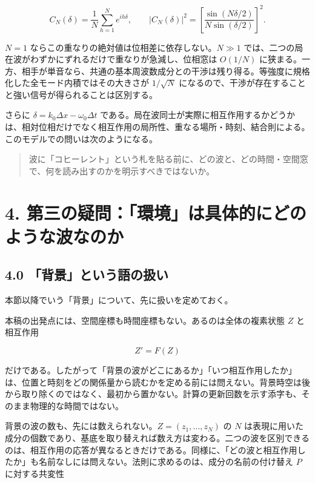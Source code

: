 \documentclass[
  a4paper,
]{ltjsarticle}
\begin{document}
\[
C_N(\delta)=\frac1N\sum_{h=1}^N e^{ih\delta},
\qquad
|C_N(\delta)|^2=
\left[\frac{\sin(N\delta/2)}{N\sin(\delta/2)}\right]^2.
\]

\(N=1\) ならこの重なりの絶対値は位相差に依存しない。\(N\gg1\)
では、二つの局在波がわずかにずれるだけで重なりが急減し、位相窓は
\(O(1/N)\)
に狭まる。一方、相手が単音なら、共通の基本周波数成分との干渉は残り得る。等強度に規格化した全モード内積ではその大きさが
\(1/\sqrt N\)
になるので、干渉が存在することと強い信号が得られることは区別する。

さらに \(\delta=k_0\Delta x-\omega_0\Delta t\)
である。局在波同士が実際に相互作用するかどうかは、相対位相だけでなく相互作用の局所性、重なる場所・時刻、結合則による。このモデルでの問いは次のようになる。

\begin{quote}
波に「コヒーレント」という札を貼る前に、どの波と、どの時間・空間窓で、何を読み出すのかを明示すべきではないか。
\end{quote}

\section{4.
第三の疑問：「環境」は具体的にどのような波なのか}\label{ux7b2cux4e09ux306eux7591ux554fux74b0ux5883ux306fux5177ux4f53ux7684ux306bux3069ux306eux3088ux3046ux306aux6ce2ux306aux306eux304b}

\subsection{4.0
「背景」という語の扱い}\label{ux80ccux666fux3068ux3044ux3046ux8a9eux306eux6271ux3044}

本節以降でいう「背景」について、先に扱いを定めておく。

本稿の出発点には、空間座標も時間座標もない。あるのは全体の複素状態 \(Z\)
と相互作用

\[
Z'=F(Z)
\]

だけである。したがって「背景の波がどこにあるか」「いつ相互作用したか」は、位置と時刻をどの関係量から読むかを定める前には問えない。背景時空は後から取り除くのではなく、最初から置かない。計算の更新回数を示す添字も、そのまま物理的な時間ではない。

背景の波の数も、先には数えられない。\(Z=(z_1,\ldots,z_N)\) の \(N\)
は表現に用いた成分の個数であり、基底を取り替えれば数え方は変わる。二つの波を区別できるのは、相互作用の応答が異なるときだけである。同様に、「どの波と相互作用したか」も名前なしには問えない。法則に求めるのは、成分の名前の付け替え
\(P\) に対する共変性
\end{document}
